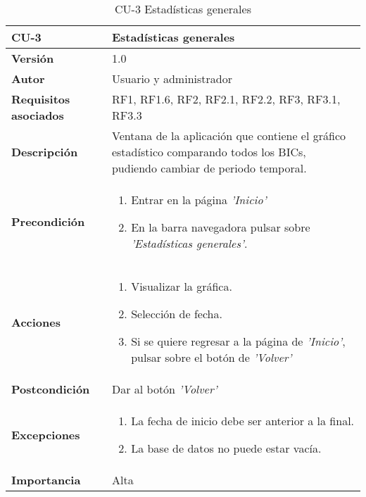 \begin{table}[h!]
	\centering
	\begin{tabularx}{\linewidth}{ p{} p{} }
		\toprule
		\textbf{CU-3}    & \textbf{Estadísticas generales}\\
		\toprule
		\textbf{Versión}              & 1.0    \\
		\textbf{Autor}                & Usuario y administrador \\
		\textbf{Requisitos asociados} & RF1, RF1.6, RF2, RF2.1, RF2.2, RF3, RF3.1, RF3.3\\
		\textbf{Descripción}          & Ventana de la aplicación que contiene el gráfico estadístico comparando todos los BICs, pudiendo cambiar de periodo temporal.  \\
        \textbf{Precondición}         & 
        \begin{enumerate}
			\def\labelenumi{\arabic{enumi}.}
			\tightlist
			\item Entrar en la página \textit{'Inicio'}
			\item En la barra navegadora pulsar sobre \textit{'Estadísticas generales'}.
            
		\end{enumerate}\\
		
		\textbf{Acciones}             &
		\begin{enumerate}
			\def\labelenumi{\arabic{enumi}.}
			\tightlist
			\item Visualizar la gráfica.
                \item Selección de fecha.
            
            \item Si se quiere regresar a la página de \textit{'Inicio'}, pulsar sobre el botón de \textit{'Volver'}

		\end{enumerate}\\
		\textbf{Postcondición}        &  Dar al botón \textit{'Volver'}\\
		\textbf{Excepciones}  &
            \begin{enumerate}
                \item La fecha de inicio debe ser anterior a la final.
                \item La base de datos no puede estar vacía.
            \end{enumerate}  \\
            
		\textbf{Importancia}          & Alta \\
		\bottomrule
	\end{tabularx}
	\caption{CU-3 Estadísticas generales}
\end{table}
